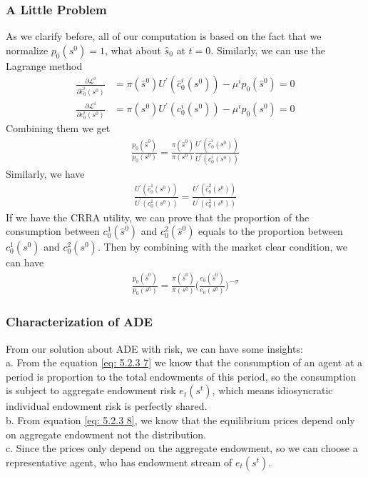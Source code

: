 \documentclass{article}
\begin{document}
\subsubsection{A Little Problem}
As we clarify before, all of our computation is based on the fact that we normalize $p_0(s^0) = 1$, what about $\hat{s}_0$ at $t = 0$. Similarly, we can use the Lagrange method
\begin{align}
	\frac{\partial \mathscr{L}^i}{\partial \hat{c}^i_0 (s^0)} &= \pi(\hat{s}^0) U^\prime(\hat{c}^i_0(s^0)) - \mu^i p_0(\hat{s}^0) = 0\\
	\frac{\partial \mathscr{L}^i}{\partial c^i_0 (s^0)} &= \pi(s^0) U^\prime(c^i_0(s^0)) - \mu^i p_0(s^0) = 0
\end{align}
Combining them we get
\begin{align}
	\frac{p_0(\hat{s}^0)}{p_0(s^0)} = \frac{\pi(\hat{s}^0)}{\pi(s^0)} \frac{U^\prime(\hat{c}^i_0(s^0))}{U^\prime(c^i_0(s^0))}
\end{align}
Similarly, we have
\begin{align}
	\frac{U^\prime(\hat{c}^1_0(s^0))}{U^\prime(c^1_0(s^0))} = \frac{U^\prime(\hat{c}^2_0(s^0))}{U^\prime(c^2_0(s^0))}
\end{align}
If we have the CRRA utility, we can prove that the proportion of the consumption between $c^1_0(\hat{s}^0)$ and $c^2_0(\hat{s}^0)$ equals to the proportion between $c^1_0(s^0)$ and $c^2_0(s^0)$. Then by combining with the market clear condition, we can have
\begin{align}
	\frac{p_0(\hat{s}^0)}{p_0(s^0)} = \frac{\pi(\hat{s}^0)}{\pi(s^0)} \bigg( \frac{e_0(\hat{s}^0)}{e_0(s^0)}\bigg) ^{-\sigma}
\end{align}

\subsubsection{Characterization of ADE}
From our solution about ADE with risk, we can have some insights:\\
\indent a. From the equation \eqref{eq: 5.2.3 7} we know that the consumption of an agent at a period is proportion to the total endowments of this period, so the consumption is subject to aggregate endowment risk $e_t(s^t)$, which means idiosyncratic individual endowment risk is perfectly shared.\\
\indent b. From equation \eqref{eq: 5.2.3 8}, we know that the equilibrium prices depend only on aggregate endowment not the distribution.\\
\indent c. Since the prices only depend on the aggregate endowment, so we can choose a representative agent, who has endowment stream of $e_t(s^t)$.
\end{document}
